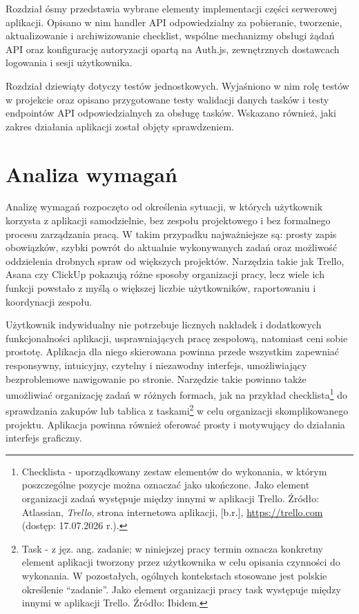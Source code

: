 \documentclass[12pt,a4paper,twoside]{report}
\newcommand{\FirstParagraph}{\noindent\ignorespaces}
\begin{document}
Rozdział ósmy przedstawia wybrane elementy implementacji części serwerowej aplikacji. Opisano w nim handler API odpowiedzialny za pobieranie, tworzenie, aktualizowanie i archiwizowanie checklist, wspólne mechanizmy obsługi żądań API oraz konfigurację autoryzacji opartą na Auth.js, zewnętrznych dostawcach logowania i sesji użytkownika.

Rozdział dziewiąty dotyczy testów jednostkowych. Wyjaśniono w nim rolę testów w projekcie oraz opisano przygotowane testy walidacji danych tasków i testy endpointów API odpowiedzialnych za obsługę tasków. Wskazano również, jaki zakres działania aplikacji został objęty sprawdzeniem.

\chapter{Analiza wymagań}

\FirstParagraph Analizę wymagań rozpoczęto od określenia sytuacji, w których użytkownik korzysta z aplikacji samodzielnie, bez zespołu projektowego i bez formalnego procesu zarządzania pracą. W takim przypadku najważniejsze są: prosty zapis obowiązków, szybki powrót do aktualnie wykonywanych zadań oraz możliwość oddzielenia drobnych spraw od większych projektów. Narzędzia takie jak Trello, Asana czy ClickUp pokazują różne sposoby organizacji pracy, lecz wiele ich funkcji powstało z myślą o większej liczbie użytkowników, raportowaniu i koordynacji zespołu.

Użytkownik indywidualny nie potrzebuje licznych nakładek i dodatkowych funkcjonalności aplikacji, usprawniających pracę zespołową, natomiast ceni sobie prostotę. Aplikacja dla niego skierowana powinna przede wszystkim zapewniać responsywny, intuicyjny, czytelny i niezawodny interfejs, umożliwiający bezproblemowe nawigowanie po stronie. Narzędzie takie powinno także umożliwiać organizację zadań w różnych formach, jak na przykład checklista\footnote{Checklista - uporządkowany zestaw elementów do wykonania, w którym poszczególne pozycje można oznaczać jako ukończone. Jako element organizacji zadań występuje między innymi w aplikacji Trello. Źródło: Atlassian, \emph{Trello}, strona internetowa aplikacji, [b.r.], \url{https://trello.com} (dostęp: 17.07.2026 r.).} do sprawdzania zakupów lub tablica z taskami\footnote{Task - z jęz. ang. zadanie; w niniejszej pracy termin oznacza konkretny element aplikacji tworzony przez użytkownika w celu opisania czynności do wykonania. W pozostałych, ogólnych kontekstach stosowane jest polskie określenie ``zadanie''. Jako element organizacji pracy task występuje między innymi w aplikacji Trello. Źródło: Ibidem.} w celu organizacji skomplikowanego projektu. Aplikacja powinna również oferować prosty i motywujący do działania interfejs graficzny.
\end{document}
